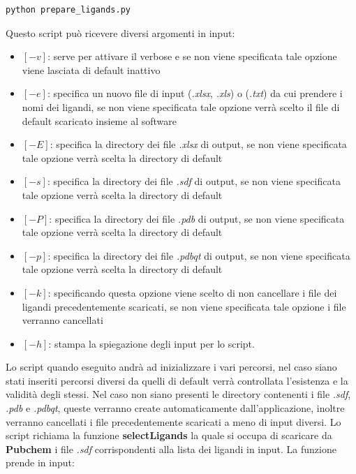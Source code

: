 \begin{lstlisting}[language=Bash, label=lst:code3, caption={Comando per scaricare la repository}]
python prepare_ligands.py
\end{lstlisting}

Questo script può ricevere diversi argomenti in input:

\begin{itemize}
    \item $[-v]$: serve per attivare il verbose e se non viene specificata tale opzione viene lasciata di default inattivo
    \item $[-e]$: specifica un nuovo file di input (\textit{.xlsx}, \textit{.xls}) o (\textit{.txt}) da cui prendere i nomi dei ligandi, se non viene specificata tale opzione verrà scelto il file di default scaricato insieme al software
    \item $[-E]$: specifica la directory dei file \textit{.xlsx} di output, se non viene specificata tale opzione verrà scelta la directory di default
    \item $[-s]$: specifica la directory dei file \textit{.sdf} di output, se non viene specificata tale opzione verrà scelta la directory di default
    \item $[-P]$: specifica la directory dei file \textit{.pdb} di output, se non viene specificata tale opzione verrà scelta la directory di default
    \item $[-p]$: specifica la directory dei file \textit{.pdbqt} di output, se non viene specificata tale opzione verrà scelta la directory di default
    \item $[-k]$: specificando questa opzione viene scelto di non cancellare i file dei ligandi precedentemente scaricati, se non viene specificata tale opzione i file verranno cancellati
    \item $[-h]$: stampa la spiegazione degli input per lo script.
\end{itemize}

Lo script quando eseguito andrà ad inizializzare i vari percorsi, nel caso siano stati inseriti percorsi diversi da quelli di default verrà controllata l'esistenza e la validità degli stessi. Nel caso non siano presenti le directory contenenti i file \textit{.sdf}, \textit{.pdb} e \textit{.pdbqt}, queste verranno create automaticamente dall'applicazione, inoltre verranno cancellati i file precedentemente scaricati a meno di input diversi.\newline
Lo script richiama la funzione \textbf{selectLigands} la quale si occupa di scaricare da \textbf{Pubchem}
i file \textit{.sdf} corrispondenti alla lista dei ligandi in input. La funzione prende in input: 

